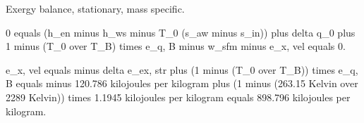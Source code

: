 Exergy balance, stationary, mass specific.

0 equals (h_en minus h_ws minus T_0 (s_aw minus s_in)) plus delta q_0 plus 1 minus (T_0 over T_B) times e_q, B minus w_sfm minus e_x, vel equals 0.

e_x, vel equals minus delta e_ex, str plus (1 minus (T_0 over T_B)) times e_q, B equals minus 120.786 kilojoules per kilogram plus (1 minus (263.15 Kelvin over 2289 Kelvin)) times 1.1945 kilojoules per kilogram equals 898.796 kilojoules per kilogram.